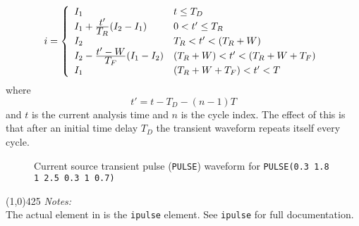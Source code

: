 \begin{equation}
i = \left\{ \begin{array}{ll}
I_1                         & t \le T_D\\
I_1 + {{\textstyle t'} \over {\textstyle T_R}} ({I_2}-{I_1})&0<t' \le T_R\\
I_2                         &{T_R} < t'< (T_R+W)\\
I_2 - {{\textstyle t'-W} \over {\textstyle T_F}} (I_1-I_2)
                   &(T_R+W) < t' < (T_R+W+T_F)\\
I_1           &(T_R+W+T_F) < t' < T
     \end{array} \right. %
\end{equation}
where
\begin{equation}
t' = t - T_D -(n-1)T
\end{equation}
and $t$ is the current analysis time and $n$ is the cycle index.
The effect of this is that after an initial time delay $T_D$ the
transient waveform repeats itself every cycle.
\begin{figure}[h]
\centering

\caption[Current source transient pulse ({\tt PULSE})
waveform]{Current source transient pulse ({\tt PULSE}) waveform
for\newline \hspace*{\fill} {\tt PULSE(0.3 1.8 1 2.5 0.3 1 0.7)}
\hspace*{\fill} \label{fig:ipulse}}
\end{figure}
\newline
\linethickness{0.5mm} \line(1,0){425}
\newline
\textit{Notes:}\\
The actual element in \FDA is the \texttt{ipulse} element.
See \texttt{ipulse} for full documentation.\\
\newline


